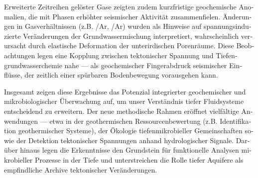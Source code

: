 \begin{otherlanguage}{ngerman}
Erweiterte Zeitreihen gelöster Gase zeigten zudem kurzfristige geochemische Anomalien, die mit Phasen erhöhter seismischer Aktivität zusammenfielen.
Änderungen in Gasverhältnissen (z.B. /Ar, /Ar) wurden als Hinweise auf spannungsinduzierte Veränderungen der Grundwassermischung interpretiert, wahrscheinlich verursacht durch elastische Deformation der unterirdischen Porenräume.
Diese Beobachtungen legen eine Kopplung zwischen tektonischer Spannung und Tiefengrundwasserchemie nahe --- als geochemischer Fingerabdruck seismischer Einflüsse, der zeitlich einer spürbaren Bodenbewegung vorausgehen kann.

Insgesamt zeigen diese Ergebnisse das Potenzial integrierter geochemischer und mikrobiologischer Überwachung auf, um unser Verständnis tiefer Fluidsysteme entscheidend zu erweitern.
Der neue methodische Rahmen eröffnet vielfältige Anwendungen --- etwa in der geothermischen Ressourcenbewertung (z.B. Identifikation geothermischer Systeme), der Ökologie tiefenmikrobieller Gemeinschaften sowie der Detektion tektonischer Spannungen anhand hydrologischer Signale.
Darüber hinaus legen die Erkenntnisse den Grundstein für funktionelle Analysen mikrobieller Prozesse in der Tiefe und unterstreichen die Rolle tiefer Aquifere als empfindliche Archive tektonischer Veränderungen.

\end{otherlanguage}

\endgroup

\vfill